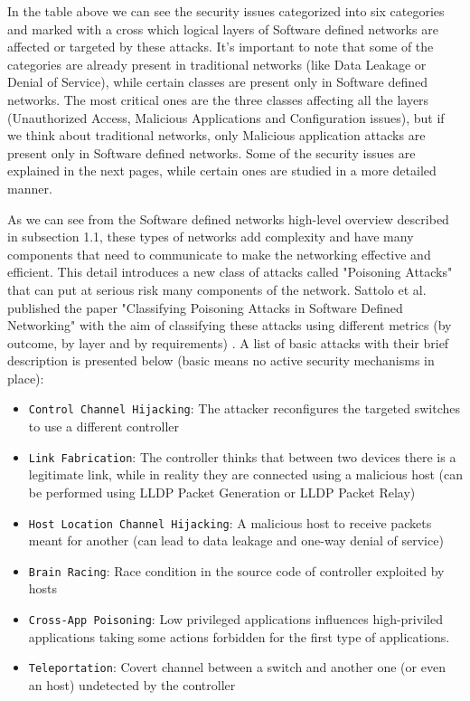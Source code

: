 \documentclass[a4paper,10pt]{memoir}
\begin{document}
In the table above we can see the security issues categorized into six categories and marked with a cross which logical layers of Software defined networks are affected or targeted by these attacks. It's important to note that some of the categories are already present in traditional networks (like Data Leakage or Denial of Service), while certain classes are present only in Software defined networks. The most critical ones are the three classes affecting all the layers (Unauthorized Access, Malicious Applications and Configuration issues), but if we think about traditional networks, only Malicious application attacks are present only in Software defined networks. Some of the security issues are explained in the next pages, while certain ones are studied in a more detailed manner.

As we can see from the Software defined networks high-level overview described in subsection 1.1, these types of networks add complexity and have many components that need to communicate to make the networking effective and efficient. This detail introduces a new class of attacks called "Poisoning Attacks" that can put at serious risk many components of the network. Sattolo et al. published the paper "Classifying Poisoning Attacks in Software Defined Networking" with the aim of classifying these attacks using different metrics (by outcome, by layer and by requirements) \cite{class-poison-attacks}. A list of basic attacks with their brief description is presented below (basic means no active security mechanisms in place):

\begin{itemize}
  \item \texttt{Control Channel Hijacking}: The attacker reconfigures the targeted switches to use a different controller
  \item \texttt{Link Fabrication}: The controller thinks that between two devices there is a legitimate link, while in reality they are connected using a malicious host (can be performed using LLDP Packet Generation or LLDP Packet Relay) 
  \item \texttt{Host Location Channel Hijacking}: A malicious host to receive packets meant for another (can lead to data leakage and one-way denial of service)
  \item \texttt{Brain Racing}: Race condition in the source code of controller exploited by hosts 
  \item \texttt{Cross-App Poisoning}: Low privileged applications influences high-priviled applications taking some actions forbidden for the first type of applications. 
  \item \texttt{Teleportation}: Covert channel between a switch and another one (or even an host) undetected by the controller
\end{itemize}
\end{document}
